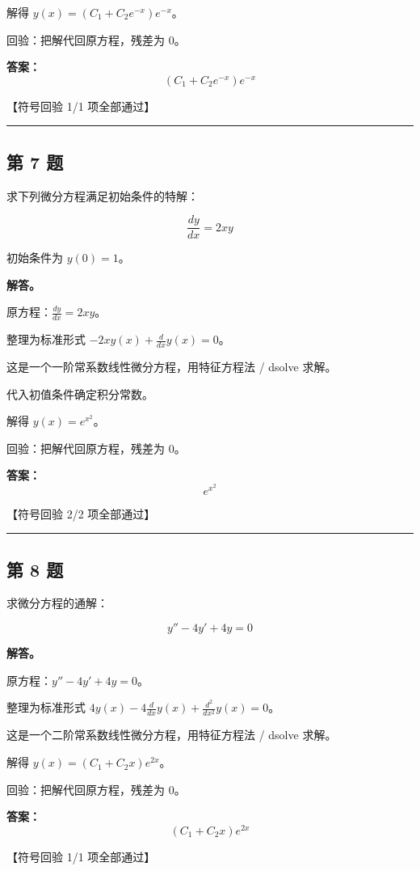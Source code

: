 \documentclass[12pt, a4paper]{article}
\newcommand{\problem}[1]{\subsection*{第 #1 题}}
\newcommand{\solution}{\textbf{解答。}}
\begin{document}
解得 $y{\left(x \right)} = \left(C_{1} + C_{2} e^{- x}\right) e^{- x}$。

回验：把解代回原方程，残差为 0。

\textbf{答案：}
\[\boxed{\left(C_{1} + C_{2} e^{- x}\right) e^{- x}}\]

\textcolor{okgreen}{【符号回验 1/1 项全部通过】}

\vspace{0.8em}
\hrule
\vspace{0.8em}

\problem{7}

求下列微分方程满足初始条件的特解：

$$
\frac{dy}{dx} = 2xy
$$

初始条件为 $y(0) = 1$。

\solution

原方程：$\frac{dy}{dx} = 2xy$。

整理为标准形式 $- 2 x y{\left(x \right)} + \frac{d}{d x} y{\left(x \right)} = 0$。

这是一个一阶常系数线性微分方程，用特征方程法 / dsolve 求解。

代入初值条件确定积分常数。

解得 $y{\left(x \right)} = e^{x^{2}}$。

回验：把解代回原方程，残差为 0。

\textbf{答案：}
\[\boxed{e^{x^{2}}}\]

\textcolor{okgreen}{【符号回验 2/2 项全部通过】}

\vspace{0.8em}
\hrule
\vspace{0.8em}

\problem{8}

求微分方程的通解：

$$
y'' - 4y' + 4y = 0
$$

\solution

原方程：$y'' - 4y' + 4y = 0$。

整理为标准形式 $4 y{\left(x \right)} - 4 \frac{d}{d x} y{\left(x \right)} + \frac{d^{2}}{d x^{2}} y{\left(x \right)} = 0$。

这是一个二阶常系数线性微分方程，用特征方程法 / dsolve 求解。

解得 $y{\left(x \right)} = \left(C_{1} + C_{2} x\right) e^{2 x}$。

回验：把解代回原方程，残差为 0。

\textbf{答案：}
\[\boxed{\left(C_{1} + C_{2} x\right) e^{2 x}}\]

\textcolor{okgreen}{【符号回验 1/1 项全部通过】}
\end{document}
